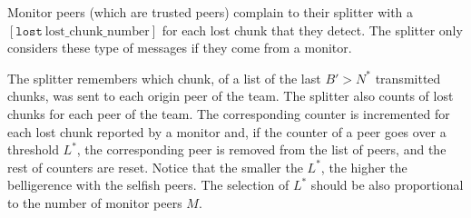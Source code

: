 

\label{sec:free_riding_control_splitter}

Monitor peers (which are trusted peers) complain to their splitter
with a $[\mathtt{lost}~\text{lost\_chunk\_number}]$ for each lost
chunk that they detect. The splitter only considers these type of
messages if they come from a monitor.

The splitter remembers which chunk, of a list of the last $B'>N^*$
transmitted chunks, was sent to each origin peer of the team. The
splitter also counts of lost chunks for each peer of the team. The
corresponding counter is incremented for each lost chunk reported by a
monitor and, if the counter of a peer goes over a threshold $L^*$, the
corresponding peer is removed from the list of peers, and the rest of
counters are reset. Notice that the smaller the $L^*$, the higher the
belligerence with the selfish peers. The selection of $L^*$ should be
also proportional to the number of monitor peers $M$.
